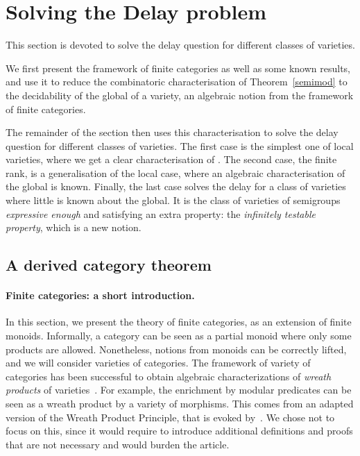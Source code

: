 \documentclass[submission,hidelink]{dmtcs-episciences}
\begin{document}
\section{Solving the Delay problem}\label{Section:Delay}



This section is devoted to solve the delay question for different classes of varieties.

We first present the framework of finite categories as well as some known results, and use it to
reduce the combinatoric characterisation of Theorem~\ref{semimod} to the decidability of the global of a variety, an algebraic notion from the framework of finite categories.


The remainder of the section then uses this characterisation to solve the delay question for different classes of varieties.
The first case is the simplest one of local varieties, where we get a clear characterisation of .
The second case, the finite rank, is a generalisation of the local case, where an algebraic characterisation of the global is known.
Finally, the last case solves the delay for a class of varieties where little is known about the global.
It is the class of varieties of semigroups \emph{expressive enough} and satisfying an extra property:
the \emph{infinitely testable property}, which is a new notion.


\subsection{A derived category theorem}
\paragraph{Finite categories: a short introduction.}

		In this section, we present the theory of finite categories, as an extension of finite monoids.
		Informally, a category can be seen as a partial monoid where only some products are allowed.
		Nonetheless, notions from monoids can be correctly lifted, and we will consider varieties of categories.
		The framework of variety of categories has been successful to obtain algebraic characterizations of
		\emph{wreath products} of varieties~\citep{Tilson}.
		For example, the enrichment by modular predicates can be seen as a wreath product by a variety of morphisms.
		This comes from an adapted version of the Wreath Product Principle, that is evoked by~\cite{CPS06b}.
		We chose not to focus on this, since it would require to introduce additional definitions and proofs that are not necessary and would burden the article.
\end{document}
